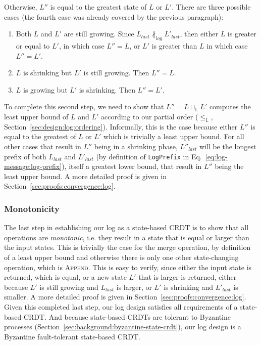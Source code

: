 \documentclass[9pt, oneside]{article}   	%
\begin{document}
Otherwise, $L''$ is equal to the greatest state of $L$ or $L'$. There are three possible cases (the fourth case was already covered by the previous paragraph):
\begin{enumerate}
	\item Both $L$ and $L'$ are still growing. Since $L_\textit{last} \nparallel_\textit{log} L'_\textit{last}$, then either $L$ is greater or equal to $L'$, in which case $L''=L$, or $L'$ is greater than $L$ in which case $L'' = L'$.
	\item $L$ is shrinking but $L'$ is still growing. Then $L''=L$.
	\item $L$ is growing but $L'$ is shrinking. Then $L''=L'$.
\end{enumerate}

To complete this second step, we need to show that $L''=L \sqcup_\mathds{L} L'$ computes the least upper bound of $L$ and $L'$ according to our partial order ($\leq_\mathds{L}$, Section~\ref{sec:design:log:ordering}). Informally, this is the case because either $L''$ is equal to the greatest of $L$ or $L'$ which is trivially a least upper bound. For all other cases that result in $L''$ being in a shrinking phase, $L''_\textit{last}$ will be the longest prefix of both $L_\textit{last}$ and $L'_\textit{last}$ (by definition of \texttt{LogPrefix} in Eq.~\ref{eq:log-message:log-prefix}), itself a greatest lower bound, that result in $L''$ being the least upper bound. A more detailed proof is given in Section~\ref{sec:proofs:convergence:log}.

\subsubsection{Monotonicity}

The last step in establishing our log as a state-based CRDT is to show that all operations are \textit{monotonic}, i.e. they result in a state that is equal or larger than the input states. This is trivially the case for the merge operation, by definition of a least upper bound and otherwise there is only one other state-changing operation, which is \textsc{Append}. This is easy to verify, since either the input state is returned, which is equal, or a new state $L'$ that is larger is returned, either because $L'$ is still growing and $L_\textit{last}$ is larger, or $L'$ is shrinking and $L'_\textit{last}$ is smaller. A more detailed proof is given in Section~\ref{sec:proofs:convergence:log}. Given this completed last step, our log design satisfies all requirements of a state-based CRDT. And because state-based CRDTs are tolerant to Byzantine processes (Section~\ref{sec:background:byzantine-state-crdt}), our log design is a Byzantine fault-tolerant state-based CRDT. 
\end{document}
